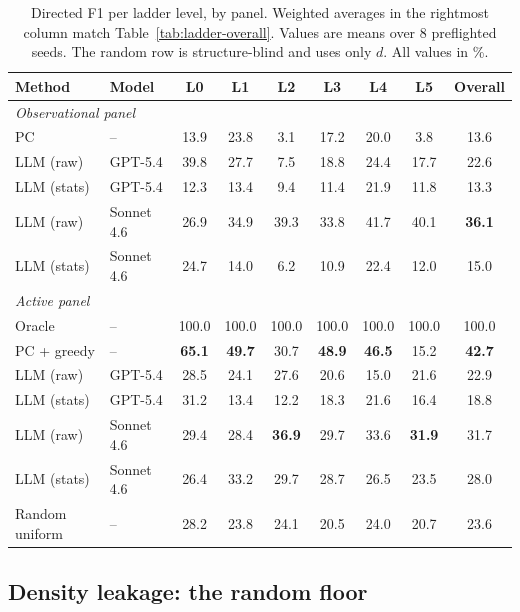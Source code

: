 \begin{table}[t]
\centering
\caption{Directed F1 per ladder level, by panel. Weighted averages in the rightmost column match Table~\ref{tab:ladder-overall}. Values are means over $8$ preflighted seeds. The random row is structure-blind and uses only $d$. All values in \%.}
\label{tab:ladder-perlevel}
\small
\begin{tabular}{llcccccc|c}
\toprule
Method & Model & L0 & L1 & L2 & L3 & L4 & L5 & Overall \\
\midrule
\multicolumn{9}{l}{\textit{Observational panel}} \\
PC              & --                & 13.9 & 23.8 & 3.1  & 17.2 & 20.0 & 3.8  & 13.6 \\
LLM (raw)       & GPT-5.4           & 39.8 & 27.7 & 7.5  & 18.8 & 24.4 & 17.7 & 22.6 \\
LLM (stats)     & GPT-5.4           & 12.3 & 13.4 & 9.4  & 11.4 & 21.9 & 11.8 & 13.3 \\
LLM (raw)       & Sonnet 4.6        & 26.9 & 34.9 & 39.3 & 33.8 & 41.7 & 40.1 & \textbf{36.1} \\
LLM (stats)     & Sonnet 4.6        & 24.7 & 14.0 & 6.2  & 10.9 & 22.4 & 12.0 & 15.0 \\
\midrule
\multicolumn{9}{l}{\textit{Active panel}} \\
Oracle          & --                & 100.0 & 100.0 & 100.0 & 100.0 & 100.0 & 100.0 & 100.0 \\
PC + greedy     & --                & \textbf{65.1} & \textbf{49.7} & 30.7 & \textbf{48.9} & \textbf{46.5} & 15.2 & \textbf{42.7} \\
LLM (raw)       & GPT-5.4           & 28.5 & 24.1 & 27.6 & 20.6 & 15.0 & 21.6 & 22.9 \\
LLM (stats)     & GPT-5.4           & 31.2 & 13.4 & 12.2 & 18.3 & 21.6 & 16.4 & 18.8 \\
LLM (raw)       & Sonnet 4.6        & 29.4 & 28.4 & \textbf{36.9} & 29.7 & 33.6 & \textbf{31.9} & 31.7 \\
LLM (stats)     & Sonnet 4.6        & 26.4 & 33.2 & 29.7 & 28.7 & 26.5 & 23.5 & 28.0 \\
\midrule
Random uniform  & --                & 28.2 & 23.8 & 24.1 & 20.5 & 24.0 & 20.7 & 23.6 \\
\bottomrule
\end{tabular}
\end{table}

\subsection{Density leakage: the random floor}
\label{sec:density-results}

